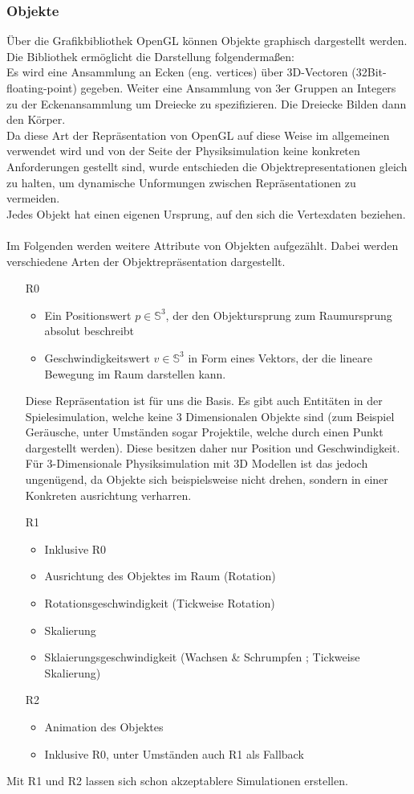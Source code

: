 \subsubsection{Objekte}
Über die Grafikbibliothek OpenGL können Objekte graphisch dargestellt werden. Die Bibliothek ermöglicht die Darstellung folgendermaßen:\\
Es wird eine Ansammlung an Ecken (eng. vertices) über 3D-Vectoren (32Bit-floating-point) gegeben. Weiter eine Ansammlung von 3er Gruppen an Integers zu der Eckenansammlung um Dreiecke zu spezifizieren. Die Dreiecke Bilden dann den Körper.\\
Da diese Art der Repräsentation von OpenGL auf diese Weise im allgemeinen verwendet wird und von der Seite der Physiksimulation keine konkreten Anforderungen gestellt sind, wurde entschieden die Objektrepresentationen gleich zu halten, um dynamische Unformungen zwischen Repräsentationen zu vermeiden.\\
Jedes Objekt hat einen eigenen Ursprung, auf den sich die Vertexdaten beziehen.\\
\\
Im Folgenden werden weitere Attribute von Objekten aufgezählt. Dabei werden verschiedene Arten der Objektrepräsentation dargestellt.
\begin{itemize}
	\item[R0]
		\begin{itemize}i
			\item Ein Positionswert $p \in \mathbb{S}^3$, der den Objektursprung zum Raumursprung absolut beschreibt
			\item Geschwindigkeitswert $v \in \mathbb{S}^3$ in Form eines Vektors, der die lineare Bewegung im Raum darstellen kann.
		\end{itemize}
		Diese Repräsentation ist für uns die Basis. Es gibt auch Entitäten in der Spielesimulation, welche keine 3 Dimensionalen Objekte sind (zum Beispiel Geräusche, unter Umständen sogar Projektile, welche durch einen Punkt dargestellt werden). Diese besitzen daher nur Position und Geschwindigkeit.
		Für 3-Dimensionale Physiksimulation mit 3D Modellen ist das jedoch ungenügend, da Objekte sich beispielsweise nicht drehen, sondern in einer Konkreten ausrichtung verharren.
	\item[R1]
		\begin{itemize}
			\item Inklusive R0
			\item Ausrichtung des Objektes im Raum (Rotation)
			\item Rotationsgeschwindigkeit (Tickweise Rotation)
			\item Skalierung
			\item Sklaierungsgeschwindigkeit (Wachsen \& Schrumpfen ; Tickweise Skalierung)
		\end{itemize}

	\item[R2]
		\begin{itemize}
			\item Animation des Objektes
			\item Inklusive R0, unter Umständen auch R1 als Fallback
		\end{itemize}
\end{itemize}

Mit R1 und R2 lassen sich schon akzeptablere Simulationen erstellen.
	

